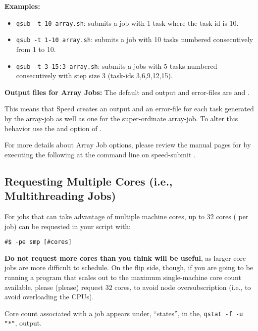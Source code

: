 \documentclass{easychair}
\begin{document}
\textbf{Examples:}
\begin{itemize}
\item
\texttt{qsub -t 10 array.sh}: submits a job with 1 task where the task-id is 10. 
\item
\texttt{qsub -t 1-10 array.sh}: submits a job with 10 tasks numbered consecutively from 1 to 10.
\item
\texttt{qsub -t 3-15:3 array.sh}: submits a jobs with 5 tasks numbered consecutively with step size 3
(task-ids 3,6,9,12,15).
\end{itemize}

\textbf{Output files for Array Jobs:}
The default and output and error-files are  and .

This means that Speed creates an output and an error-file for each task generated by the array-job as well as one
for the super-ordinate array-job. To alter this behavior use the  and  option of . 

For more details about Array Job options, please review the manual pages for  by executing 
the following at the command line on speed-submit .

\subsection{Requesting Multiple Cores (i.e., Multithreading Jobs)}

For jobs that can take advantage of multiple machine cores, up to 32 cores (
per job) can be requested in your script with: 

\begin{verbatim}
#$ -pe smp [#cores] 
\end{verbatim}

\textbf{Do not request more cores than you think will be useful}, as larger-core
jobs are more difficult to schedule. On the flip side, though, if you 
are going to be running a program that scales out to the maximum single-machine
core count available, please (please) request 32 cores, to avoid node 
oversubscription (i.e., to avoid overloading the CPUs).

Core count associated with a job appears under, ``states'', in the,
\texttt{qstat -f -u "*"}, output.

\end{document}
